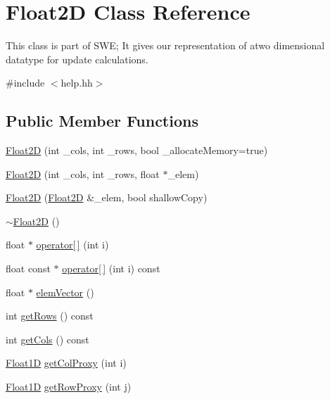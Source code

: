 \hypertarget{classFloat2D}{}\section{Float2D Class Reference}
\label{classFloat2D}


This class is part of S\+WE; It gives our representation of atwo dimensional datatype for update calculations.  




{\ttfamily \#include $<$help.\+hh$>$}

\subsection*{Public Member Functions}
\begin{DoxyCompactItemize}
\item 
\hyperlink{classFloat2D_aceac75782e5db5cb644a893de73f7933}{Float2D} (int \+\_\+cols, int \+\_\+rows, bool \+\_\+allocate\+Memory=true)
\item 
\hyperlink{classFloat2D_a51ccca3defa8be28c89f63f1768a79b0}{Float2D} (int \+\_\+cols, int \+\_\+rows, float $\ast$\+\_\+elem)
\item 
\hyperlink{classFloat2D_aa4c91cf3f61da6180d2d3e92699d7c92}{Float2D} (\hyperlink{classFloat2D}{Float2D} \&\+\_\+elem, bool shallow\+Copy)
\item 
\hyperlink{classFloat2D_a61217491656d4b9df8146f77e083f215}{$\sim$\+Float2D} ()
\item 
float $\ast$ \hyperlink{classFloat2D_a0c514deed419976c1de95a476148edb7}{operator\mbox{[}$\,$\mbox{]}} (int i)
\item 
float const $\ast$ \hyperlink{classFloat2D_a2890be398d2b6381253169f26225e93b}{operator\mbox{[}$\,$\mbox{]}} (int i) const 
\item 
float $\ast$ \hyperlink{classFloat2D_ab7ea635b12555d35bae9c4ef87024b07}{elem\+Vector} ()
\item 
int \hyperlink{classFloat2D_a9f523397af4e14fb2006ad4484f95380}{get\+Rows} () const 
\item 
int \hyperlink{classFloat2D_af029eb7eb99dc96e95095796d7ea93fa}{get\+Cols} () const 
\item 
\hyperlink{classFloat1D}{Float1D} \hyperlink{classFloat2D_abea4f5de8e07341d0564a87065af6091}{get\+Col\+Proxy} (int i)
\item 
\hyperlink{classFloat1D}{Float1D} \hyperlink{classFloat2D_a6c3329adba1854ea3e9589fd7271765b}{get\+Row\+Proxy} (int j)
\end{DoxyCompactItemize}



